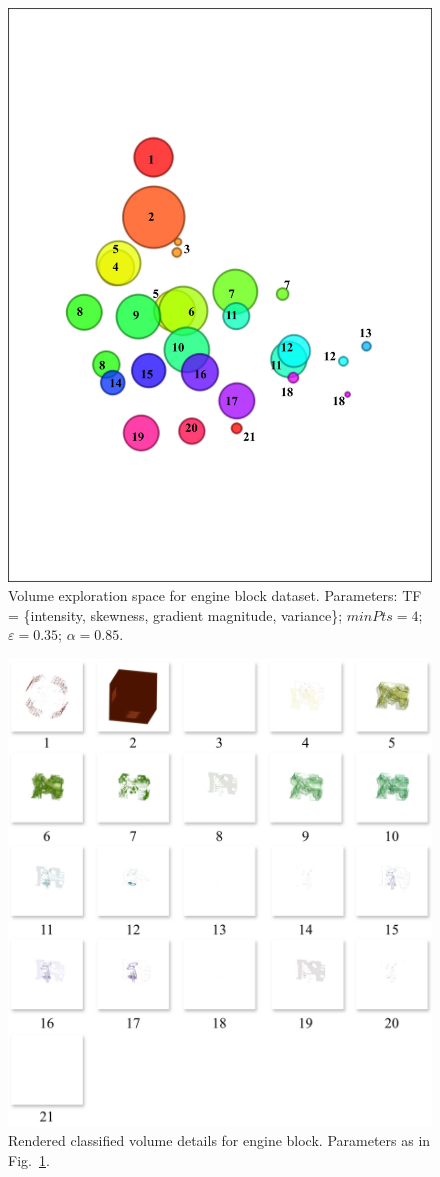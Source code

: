 \begin{figure}[htb!]
    \centering
    \includegraphics[width=0.7\columnwidth]{figs/engine-block-clusters-tf.jpg}
    \caption{Volume exploration space for engine block dataset. Parameters: TF = \{intensity, skewness, gradient magnitude, variance\}; $minPts=4$; $\varepsilon=0.35$; $\alpha=0.85$.}
    \label{fig:engine-block-clusters-tf}
\end{figure}

\begin{figure}[htb!]
    \centering
    \includegraphics[width=\columnwidth]{figs/engine-block-clusters.jpg}
    \caption{Rendered classified volume details for engine block. Parameters as in Fig.~\ref{fig:engine-block-clusters-tf}.}
    \label{fig:engine-block-clusters}
\end{figure}

